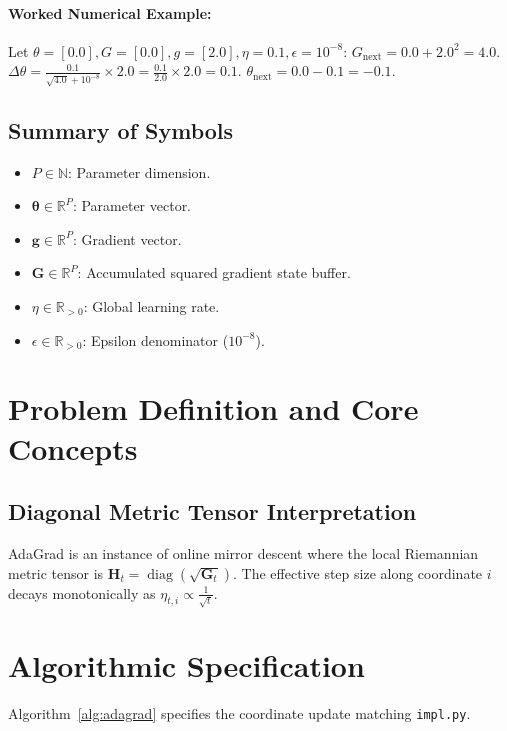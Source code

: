 \documentclass[11pt]{article}
\begin{document}
\paragraph{Worked Numerical Example:}
Let $\theta = [0.0], G = [0.0], g = [2.0], \eta = 0.1, \epsilon = 10^{-8}$:
$G_{\mathrm{next}} = 0.0 + 2.0^2 = 4.0$.
$\Delta\theta = \frac{0.1}{\sqrt{4.0} + 10^{-8}} \times 2.0 = \frac{0.1}{2.0} \times 2.0 = 0.1$.
$\theta_{\mathrm{next}} = 0.0 - 0.1 = -0.1$.

\subsection{Summary of Symbols}
\begin{itemize}
    \item $P \in \mathbb{N}$: Parameter dimension.
    \item $\boldsymbol{\theta} \in \mathbb{R}^P$: Parameter vector.
    \item $\mathbf{g} \in \mathbb{R}^P$: Gradient vector.
    \item $\mathbf{G} \in \mathbb{R}^P$: Accumulated squared gradient state buffer.
    \item $\eta \in \mathbb{R}_{>0}$: Global learning rate.
    \item $\epsilon \in \mathbb{R}_{>0}$: Epsilon denominator ($10^{-8}$).
\end{itemize}

\section{Problem Definition and Core Concepts}
\label{sec:problem_definition}

\subsection{Diagonal Metric Tensor Interpretation}
AdaGrad is an instance of online mirror descent where the local Riemannian metric tensor is $\mathbf{H}_t = \operatorname{diag}(\sqrt{\mathbf{G}_t})$. The effective step size along coordinate $i$ decays monotonically as $\eta_{t, i} \propto \frac{1}{\sqrt{t}}$.

\section{Algorithmic Specification}
\label{sec:algorithm}

Algorithm~\ref{alg:adagrad} specifies the coordinate update matching \texttt{impl.py}.
\end{document}
